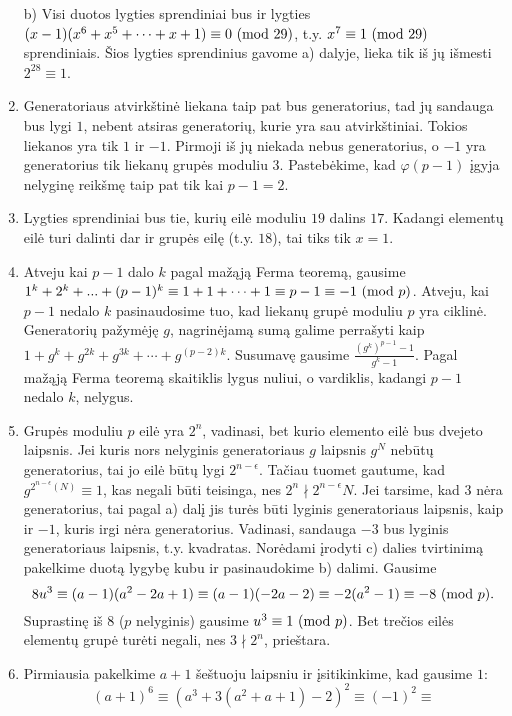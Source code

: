 \begin{enumerate}
    b) Visi duotos lygties sprendiniai bus ir lygties $(x-1)(x^6 + x^5 +
    \dots + x + 1) \equiv 0 \ (\text{mod } 29)$, t.y. $x^7 \equiv 1 \ (\text{mod } 29)$
    sprendiniais. Šios lygties sprendinius gavome a) dalyje, lieka tik iš
    jų išmesti $2^{28} \equiv 1$.
\item
    Generatoriaus atvirkštinė liekana taip pat bus generatorius, tad jų
    sandauga bus lygi $1$, nebent atsiras generatorių, kurie yra sau
    atvirkštiniai. Tokios liekanos yra tik $1$ ir $-1$. Pirmoji iš jų
    niekada nebus generatorius, o $-1$ yra generatorius tik liekanų grupės
    moduliu $3$. Pastebėkime, kad $\varphi(p-1)$ įgyja nelyginę reikšmę
    taip pat tik kai $p-1 = 2$.
\item
    Lygties sprendiniai bus tie, kurių eilė moduliu $19$ dalins $17$.
    Kadangi elementų eilė turi dalinti dar ir grupės eilę (t.y. $18$), tai
    tiks tik $x=1$.
\item
    Atveju kai $p-1$ dalo $k$ pagal mažąją Ferma teoremą, gausime $1^k + 2^k +
    ... + (p-1)^k \equiv 1 + 1 + \cdots + 1 \equiv p-1 \equiv -1 \ (\text{mod } p)$.
    Atveju, kai $p-1$ nedalo $k$ pasinaudosime tuo, kad liekanų grupė
    moduliu $p$ yra ciklinė. Generatorių pažymėję $g$, nagrinėjamą sumą
    galime perrašyti kaip $1 + g^k + g^{2k} + g^{3k} + \cdots +
    g^{(p-2)k}$. Susumavę gausime $\frac{(g^k)^{p-1} - 1}{g^k - 1}$. Pagal
    mažąją Ferma teoremą skaitiklis lygus nuliui, o vardiklis, kadangi
    $p-1$ nedalo $k$, nelygus.
\item
    Grupės moduliu $p$ eilė yra $2^n$, vadinasi, bet kurio elemento eilė
    bus dvejeto laipsnis. Jei kuris nors nelyginis generatoriaus
    $g$ laipsnis $g^N$ nebūtų generatorius, tai jo eilė būtų lygi
    $2^{n-\epsilon}$. Tačiau tuomet gautume, kad
    $g^{2^{n-\epsilon}(N)} \equiv 1$, kas negali būti teisinga, nes
    $2^n \nmid 2^{n-\epsilon}N$. Jei tarsime, kad $3$ nėra generatorius,
    tai pagal a) dalį jis turės būti lyginis generatoriaus laipsnis, kaip
    ir $-1$, kuris irgi nėra generatorius. Vadinasi, sandauga $-3$ bus
    lyginis generatoriaus laipsnis, t.y. kvadratas. Norėdami įrodyti c)
    dalies tvirtinimą pakelkime duotą lygybę kubu ir pasinaudokime b)
    dalimi. Gausime $$8u^3 \equiv (a-1)(a^2-2a+1) \equiv (a-1)(-2a -2)
    \equiv -2(a^2-1) \equiv -8 \ (\text{mod } p).$$ Suprastinę iš $8$ ($p$ nelyginis)
    gausime $u^3 \equiv 1 \ (\text{mod } p)$. Bet trečios eilės elementų grupė turėti
    negali, nes $3 \nmid 2^n$, prieštara.
\item
    Pirmiausia pakelkime $a+1$ šeštuoju laipsniu ir įsitikinkime, kad gausime
    $1$: $$(a+1)^6 \equiv (a^3 + 3(a^2 + a + 1) -2)^2 \equiv (-1)^2 \equiv
$$
\end{enumerate}
